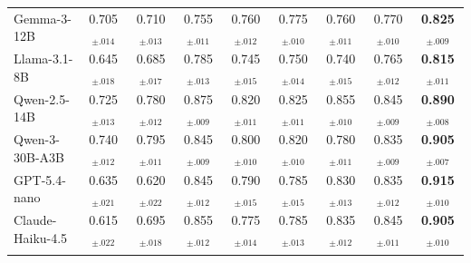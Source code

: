 \begin{table}[t]
\begin{tabular}{lcccccccc}
\rowcolor{gray!10}
\multicolumn{9}{c}{\textbf{TruthfulQA}} \\
\midrule

 Gemma-3-12B      & 0.705$_{\pm .014}$ & 0.710$_{\pm .013}$ & 0.755$_{\pm .011}$ & 0.760$_{\pm .012}$ & 0.775$_{\pm .010}$ & 0.760$_{\pm .011}$ & 0.770$_{\pm .010}$ & \textbf{\cellcolor{blue!6}0.825$_{\pm .009}$} \\
 Llama-3.1-8B     & 0.645$_{\pm .018}$ & 0.685$_{\pm .017}$ & 0.785$_{\pm .013}$ & 0.745$_{\pm .015}$ & 0.750$_{\pm .014}$ & 0.740$_{\pm .015}$ & 0.765$_{\pm .012}$ & \textbf{\cellcolor{blue!6}0.815$_{\pm .011}$} \\
 Qwen-2.5-14B     & 0.725$_{\pm .013}$ & 0.780$_{\pm .012}$ & 0.875$_{\pm .009}$ & 0.820$_{\pm .011}$ & 0.825$_{\pm .011}$ & 0.855$_{\pm .010}$ & 0.845$_{\pm .009}$ & \textbf{\cellcolor{blue!6}0.890$_{\pm .008}$} \\
 Qwen-3-30B-A3B   & 0.740$_{\pm .012}$ & 0.795$_{\pm .011}$ & 0.845$_{\pm .009}$ & 0.800$_{\pm .010}$ & 0.820$_{\pm .010}$ & 0.780$_{\pm .011}$ & 0.835$_{\pm .009}$ & \textbf{\cellcolor{blue!6}0.905$_{\pm .007}$} \\
 GPT-5.4-nano     & 0.635$_{\pm .021}$ & 0.620$_{\pm .022}$ & 0.845$_{\pm .012}$ & 0.790$_{\pm .015}$ & 0.785$_{\pm .015}$ & 0.830$_{\pm .013}$ & 0.835$_{\pm .012}$ & \textbf{\cellcolor{blue!6}0.915$_{\pm .010}$} \\
 Claude-Haiku-4.5 & 0.615$_{\pm .022}$ & 0.695$_{\pm .018}$ & 0.855$_{\pm .012}$ & 0.775$_{\pm .014}$ & 0.785$_{\pm .013}$ & 0.835$_{\pm .012}$ & 0.845$_{\pm .011}$ & \textbf{\cellcolor{blue!6}0.905$_{\pm .010}$} \\
\midrule

\rowcolor{gray!10}
\multicolumn{9}{c}{\textbf{GSM8K}} \\
\midrule


\end{tabular}
\end{table}
